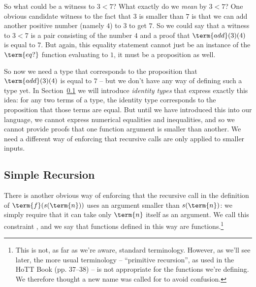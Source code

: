 So what could be a witness to $3 < 7$?  What exactly do we \emph{mean} by $3 < 7$?
One obvious candidate witness to the fact that $3$ is smaller than $7$ is that we can add another positive number (namely $4$) to $3$ to get $7$.  So we could say that a witness to $3 < 7$ is a pair consisting of the number $4$ and a proof that $\term{add}(3)(4)$ is equal to $7$.  But again, this equality statement cannot just be an instance of the $\term{eq?}$ function evaluating to $1$, it must be a proposition as well.  

So now we need a type that corresponds to the proposition that $\term{add}(3)(4)$ is equal to $7$ -- but we don't have any way of defining such a type yet.  In Section~\ref{} we will introduce \emph{identity types} that express exactly this idea: for any two terms of a type, the identity type corresponds to the proposition that those terms are equal.  But until we have introduced this into our language, we cannot express numerical equalities and inequalities, and so we cannot provide proofs that one function argument is smaller than another.  We need a different way of enforcing that recursive calls are only applied to smaller inputs.


\subsection{Simple Recursion}

There is another obvious way of enforcing that the recursive call in the definition of $\term{f}(s(\term{n}))$ uses an argument smaller than $s(\term{n})$: we simply require that it can take only $\term{n}$ itself as an argument.  We call this constraint , and we say that functions defined in this way are  functions.\footnote{
This is not, as far as we're aware, standard terminology.  However, as we'll see later, the more usual terminology -- ``primitive recursion'', as used in the HoTT Book (pp. 37--38) -- is not appropriate for the functions we're defining.  We therefore thought a new name was called for to avoid confusion.
}

